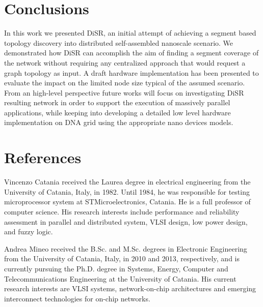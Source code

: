 \documentclass[preprint]{elsarticle}
\newcommand{\disr}{{\sf DiSR}}
\begin{document}







\section{Conclusions}
In this work we presented \disr{}, an initial attempt of achieving a segment based
topology discovery into distributed self-assembled nanoscale scenario. We
demonstrated how \disr{} can accomplish the aim of finding a segment
coverage of the network without requiring any centralized approach
that would request a graph topology as input. A draft hardware
implementation has been presented to evaluate the impact on the limited
node size typical of the assumed scenario. From an high-level
perspective future works will focus on
investigating \disr{} resulting network in order to support the
execution of massively parallel applications, while keeping into
developing a detailed low level hardware implementation on
DNA grid using the appropriate nano devices models.


%
% 
%

%
\section*{References}

\vspace{10 mm}

Vincenzo Catania received the Laurea degree in electrical engineering
from the University of Catania, Italy, in 1982. Until 1984, he was
responsible for testing microprocessor system at STMicroelectronics,
Catania. He is a full professor of computer
science. His research interests include performance and reliability
assessment in parallel and distributed system, VLSI design, low power
design, and fuzzy logic.

Andrea Mineo received the B.Sc. and M.Sc. degrees in Electronic
Engineering from the University of Catania, Italy, in 2010 and 2013,
respectively, and is currently pursuing the Ph.D. degree in Systems,
Energy, Computer and Telecommunications Engineering at the University
of Catania.  His current research interests are VLSI systems,
network-on-chip architectures  and emerging interconnect technologies
for on-chip networks.
\end{document}
